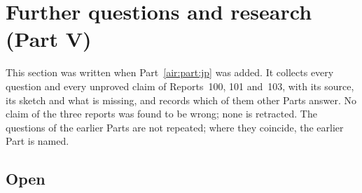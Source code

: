 \documentclass[11pt,letterpaper]{article}
\numberwithin{equation}{section}
\theoremstyle{remark}
\begin{document}
\section{Further questions and research (Part V)}\label{air:jp:sec:questions}
This section was written when Part~\ref{air:part:jp} was added. It collects every question and every unproved claim of Reports~100, 101 and~103, with its source, its sketch and what is missing, and records which of them other Parts answer. No claim of the three reports was found to be wrong; none is retracted. The questions of the earlier Parts are not repeated; where they coincide, the earlier Part is named.

\subsection{Open}
\end{document}
